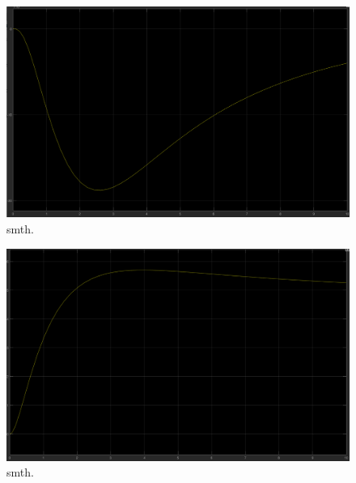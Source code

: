\begin{figure}[H]
  \centering
    \includegraphics[width=1\textwidth]{images/closedloopGzstep.png}
	\caption{smth.}
	\label{closedloop4}
\end{figure}

\begin{figure}[H]
  \centering
    \includegraphics[width=1\textwidth]{images/closedloopNystep.png}
	\caption{smth.}
	\label{closedloop5}
\end{figure}

